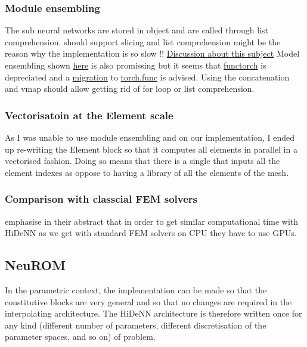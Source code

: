     \subsubsection{Module ensembling}
    The sub neural networks are stored in  object and are called through list comprehension.
     should support slicing and list comprehension might be the reason why the implementation is so slow !! \href{https://github.com/pytorch/pytorch/issues/37718}{Discussion about this subject} Model ensembling shown \href{https://pytorch.org/functorch/stable/notebooks/ensembling.html}{here} is also promissing but it seems that \href{https://pytorch.org/functorch/stable/}{functorch} is depreciated and a \href{https://pytorch.org/docs/master/func.migrating.html}{migration} to \href{https://pytorch.org/docs/stable/func.html}{torch.func} is advised. Using the concatenation and vmap should allow getting rid of for loop or list comprehension.

    \subsubsection{Vectorisatoin at the Element scale}

    As I was unable to use module ensembling and  on our implementation, I ended up re-writing the Element block so that it computes all elements in parallel in a vectorised fashion. Doing so means that there is a single  that inputs all the element indexes as oppose to having a library of all the elements of the mesh.

    \subsubsection{Comparison with classcial FEM solvers}
    \cite{park_convolution_2023} emphasise in their abstract that in order to get similar computational time with HiDeNN as we get with standard FEM solvers on CPU they have to use GPUs.
\subsection{NeuROM}
 In the parametric context, the implementation can be made so that the constitutive blocks are very general and so that no changes are required in the interpolating architecture. The HiDeNN architecture is therefore written once for any kind (different number of parameters, different discretisation of the parameter spaces, and so on)  of problem. 

